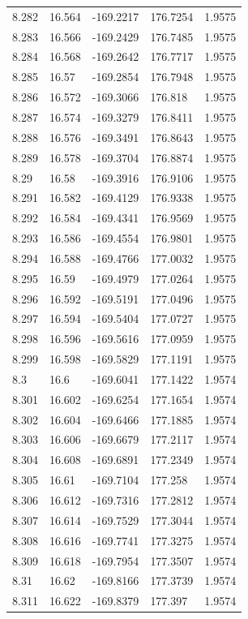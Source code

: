 \begin{tabular}{lllll}
8.282 & 16.564 & -169.2217 & 176.7254 & 1.9575 \\
8.283 & 16.566 & -169.2429 & 176.7485 & 1.9575 \\
8.284 & 16.568 & -169.2642 & 176.7717 & 1.9575 \\
8.285 & 16.57 & -169.2854 & 176.7948 & 1.9575 \\
8.286 & 16.572 & -169.3066 & 176.818 & 1.9575 \\
8.287 & 16.574 & -169.3279 & 176.8411 & 1.9575 \\
8.288 & 16.576 & -169.3491 & 176.8643 & 1.9575 \\
8.289 & 16.578 & -169.3704 & 176.8874 & 1.9575 \\
8.29 & 16.58 & -169.3916 & 176.9106 & 1.9575 \\
8.291 & 16.582 & -169.4129 & 176.9338 & 1.9575 \\
8.292 & 16.584 & -169.4341 & 176.9569 & 1.9575 \\
8.293 & 16.586 & -169.4554 & 176.9801 & 1.9575 \\
8.294 & 16.588 & -169.4766 & 177.0032 & 1.9575 \\
8.295 & 16.59 & -169.4979 & 177.0264 & 1.9575 \\
8.296 & 16.592 & -169.5191 & 177.0496 & 1.9575 \\
8.297 & 16.594 & -169.5404 & 177.0727 & 1.9575 \\
8.298 & 16.596 & -169.5616 & 177.0959 & 1.9575 \\
8.299 & 16.598 & -169.5829 & 177.1191 & 1.9575 \\
8.3 & 16.6 & -169.6041 & 177.1422 & 1.9574 \\
8.301 & 16.602 & -169.6254 & 177.1654 & 1.9574 \\
8.302 & 16.604 & -169.6466 & 177.1885 & 1.9574 \\
8.303 & 16.606 & -169.6679 & 177.2117 & 1.9574 \\
8.304 & 16.608 & -169.6891 & 177.2349 & 1.9574 \\
8.305 & 16.61 & -169.7104 & 177.258 & 1.9574 \\
8.306 & 16.612 & -169.7316 & 177.2812 & 1.9574 \\
8.307 & 16.614 & -169.7529 & 177.3044 & 1.9574 \\
8.308 & 16.616 & -169.7741 & 177.3275 & 1.9574 \\
8.309 & 16.618 & -169.7954 & 177.3507 & 1.9574 \\
8.31 & 16.62 & -169.8166 & 177.3739 & 1.9574 \\
8.311 & 16.622 & -169.8379 & 177.397 & 1.9574 \\

\end{tabular}
